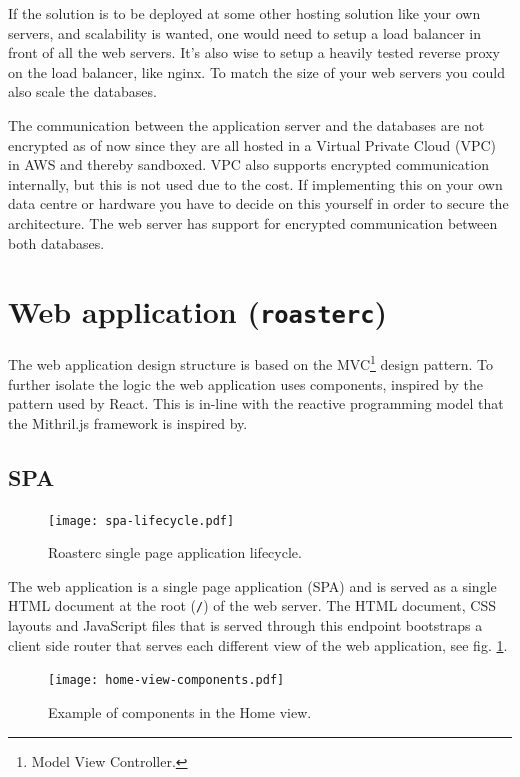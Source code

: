 \documentclass[12pt,a4paper]{report}
\begin{document}
If the solution is to be deployed at some other hosting solution like your own servers, and scalability is wanted, one would need to setup a load balancer in front of all the web servers. It's also wise to setup a heavily tested reverse proxy on the load balancer, like nginx. To match the size of your web servers you could also scale the databases. 

The communication between the application server and the databases are not encrypted as of now since they are all hosted in a Virtual Private Cloud (VPC) in AWS and thereby sandboxed. VPC also supports encrypted communication internally, but this is not used due to the cost. If implementing this on your own data centre or hardware you have to decide on this yourself in order to secure the architecture. The web server has  support for encrypted communication between both databases. 

\section{Web application (\texttt{roasterc})}
The web application design structure is based on the MVC\footnote{Model View Controller.} design pattern. To further isolate the logic the web application uses components, inspired by the pattern used by React\cite{react-component}. This is in-line with the reactive programming model that the Mithril.js framework is inspired by.

\subsection{SPA}
\begin{figure}[H]
  \centering
  \texttt{[image: spa-lifecycle.pdf]}
  \caption{Roasterc single page application lifecycle.}
  \label{fig:roasterc-lifecycle}
\end{figure}

The web application is a single page application (SPA) and is served as a single HTML document at the root (\texttt{/}) of the web server. The HTML document, CSS layouts and JavaScript files that is served through this endpoint bootstraps a client side router that serves each different view of the web application, see fig. \ref{fig:roasterc-lifecycle}. 

\begin{figure}[H]
  \centering
  \texttt{[image: home-view-components.pdf]}
  \caption{Example of components in the Home view.}
  \label{fig:home-view-components}
\end{figure}
\end{document}
